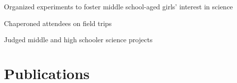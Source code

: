 \documentclass[]{deedy-resume-openfont}
\begin{document}
\begin{minipage}[t]{0.7\textwidth}
\begin{tightemize}
\item Organized experiments to foster middle school-aged girls' interest in
science
\item Chaperoned attendees on field trips
\end{tightemize}

\begin{tightemize}
\item Judged middle and high schooler science projects
\end{tightemize}

\section{Publications} 
\renewcommand\refname{\vskip -1.5em} %


\nocite{*}

\end{minipage}
\hfill
\end{document}
